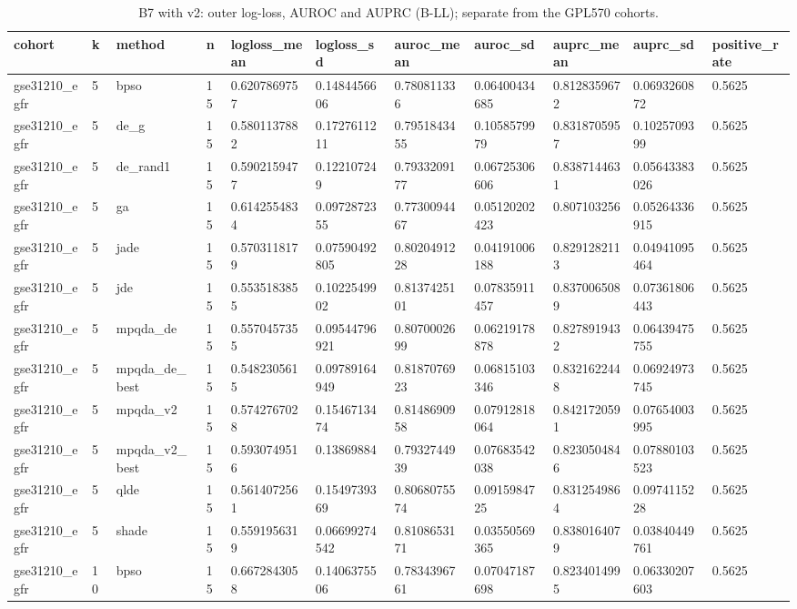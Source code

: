 \begin{table}[t]
\centering
\caption{B7 with v2: outer log-loss, AUROC and AUPRC (B-LL); separate from the GPL570 cohorts.}\label{tab:table_b7_v2}
\begin{tabular}{lllllllllll}
\hline
cohort & k & method & n & logloss\_mean & logloss\_sd & auroc\_mean & auroc\_sd & auprc\_mean & auprc\_sd & positive\_rate \\
\hline
gse31210\_egfr & 5 & bpso & 15 & 0.6207869757 & 0.1484456606 & 0.780811336 & 0.06400434685 & 0.8128359672 & 0.0693260872 & 0.5625 \\
gse31210\_egfr & 5 & de\_g & 15 & 0.5801137882 & 0.1727611211 & 0.7951843455 & 0.1058579979 & 0.8318705957 & 0.1025709399 & 0.5625 \\
gse31210\_egfr & 5 & de\_rand1 & 15 & 0.5902159477 & 0.122107249 & 0.7933209177 & 0.06725306606 & 0.8387144631 & 0.05643383026 & 0.5625 \\
gse31210\_egfr & 5 & ga & 15 & 0.6142554834 & 0.0972872355 & 0.7730094467 & 0.05120202423 & 0.807103256 & 0.05264336915 & 0.5625 \\
gse31210\_egfr & 5 & jade & 15 & 0.5703118179 & 0.07590492805 & 0.8020491228 & 0.04191006188 & 0.8291282113 & 0.04941095464 & 0.5625 \\
gse31210\_egfr & 5 & jde & 15 & 0.5535183855 & 0.1022549902 & 0.8137425101 & 0.07835911457 & 0.8370065089 & 0.07361806443 & 0.5625 \\
gse31210\_egfr & 5 & mpqda\_de & 15 & 0.5570457355 & 0.09544796921 & 0.8070002699 & 0.06219178878 & 0.8278919432 & 0.06439475755 & 0.5625 \\
gse31210\_egfr & 5 & mpqda\_de\_best & 15 & 0.5482305615 & 0.09789164949 & 0.8187076923 & 0.06815103346 & 0.8321622448 & 0.06924973745 & 0.5625 \\
gse31210\_egfr & 5 & mpqda\_v2 & 15 & 0.5742767028 & 0.1546713474 & 0.8148690958 & 0.07912818064 & 0.8421720591 & 0.07654003995 & 0.5625 \\
gse31210\_egfr & 5 & mpqda\_v2\_best & 15 & 0.5930749516 & 0.13869884 & 0.7932744939 & 0.07683542038 & 0.8230504846 & 0.07880103523 & 0.5625 \\
gse31210\_egfr & 5 & qlde & 15 & 0.5614072561 & 0.1549739369 & 0.8068075574 & 0.0915984725 & 0.8312549864 & 0.0974115228 & 0.5625 \\
gse31210\_egfr & 5 & shade & 15 & 0.5591956319 & 0.06699274542 & 0.8108653171 & 0.03550569365 & 0.8380164079 & 0.03840449761 & 0.5625 \\
gse31210\_egfr & 10 & bpso & 15 & 0.6672843058 & 0.1406375506 & 0.7834396761 & 0.07047187698 & 0.8234014995 & 0.06330207603 & 0.5625 \\

\end{tabular}
\end{table}
